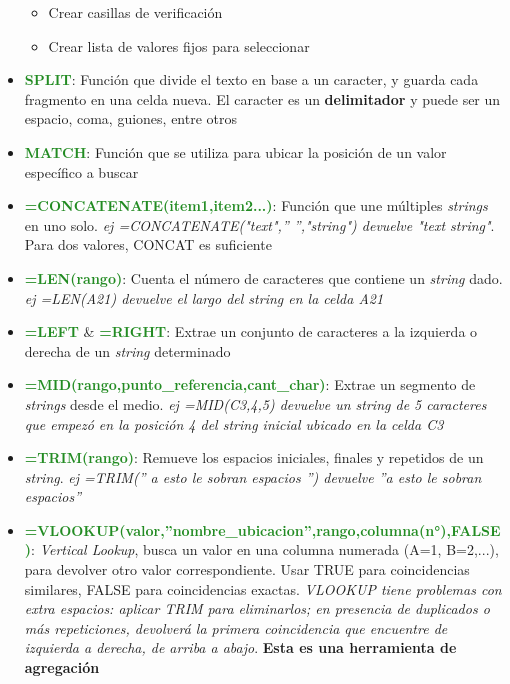 \begin{itemize}
{\begin{itemize}
        \item {Crear casillas de verificación}
        \item {Crear lista de valores fijos para seleccionar}   
    \end{itemize}} 
    \item {\textcolor{ForestGreen}{\textbf{SPLIT}}: Función que divide el texto en base a un caracter, y guarda cada fragmento en una celda nueva. El caracter es un \textbf{delimitador} y puede ser un espacio, coma, guiones, entre otros}
    \item {\textcolor{ForestGreen}{\textbf{MATCH}}: Función que se utiliza para ubicar la posición de un valor específico a buscar}
    \item {\textcolor{ForestGreen}{\textbf{=CONCATENATE(item1,item2...)}}: Función que une múltiples \textit{strings} en uno solo. \textit{ej =CONCATENATE("text",'' '',"string") devuelve "text string"}. Para dos valores, CONCAT es suficiente}
    \item {\textcolor{ForestGreen}{\textbf{=LEN(rango)}}: Cuenta el número de caracteres que contiene un \textit{string} dado. \textit{ej =LEN(A21) devuelve el largo del string en la celda A21}}
    \item {\textcolor{ForestGreen}{\textbf{=LEFT}} \& \textcolor{ForestGreen}{\textbf{=RIGHT}}: Extrae un conjunto de caracteres a la izquierda o derecha de un \textit{string} determinado}
    \item {\textcolor{ForestGreen}{\textbf{=MID(rango,punto\_referencia,cant\_char)}}: Extrae un segmento de \textit{strings} desde el medio. \textit{ej =MID(C3,4,5) devuelve un string de 5 caracteres que empezó en la posición 4 del string inicial ubicado en la celda C3}}
    \item {\textcolor{ForestGreen}{\textbf{=TRIM(rango)}}: Remueve los espacios iniciales, finales y repetidos de un \textit{string}. \textit{ej =TRIM('' a esto le sobran espacios  '') devuelve ''a esto le sobran espacios''}}
    \item {\textcolor{ForestGreen}{\textbf{=VLOOKUP(valor,''nombre\_ubicacion'',rango,columna(n°),FALSE)}}: \textit{Vertical Lookup}, busca un valor en una columna numerada (A=1, B=2,...), para devolver otro valor correspondiente. Usar TRUE para coincidencias similares, FALSE para coincidencias exactas. \textit{VLOOKUP tiene problemas con extra espacios: aplicar TRIM para eliminarlos; en presencia de duplicados o más repeticiones, devolverá la primera coincidencia que encuentre de izquierda a derecha, de arriba a abajo}. \textbf{Esta es una herramienta de agregación}}

\end{itemize}
